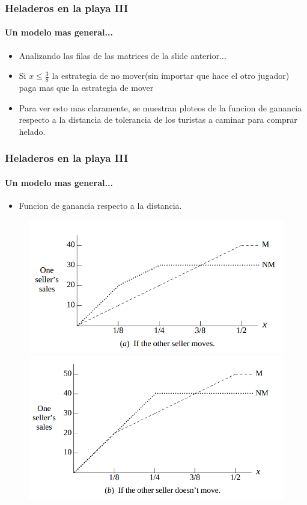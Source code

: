 \documentclass{beamer}
\begin{document}
\begin{frame}
  \frametitle{Heladeros en la playa III}
  \framesubtitle{Un modelo mas general...}
  \begin{itemize}
    \setlength{\itemsep}{4pt}
    \item Analizando las filas de las matrices de la slide anterior...
    \pause
    \item Si $ x \leq \frac{3}{8}$ la estrategia de no mover(sin importar que hace el otro jugador) paga mas que la estrategia de mover
    \pause    
    \item Para ver esto mas claramente, se muestran ploteos de la funcion de ganancia respecto a la distancia de tolerancia de los turistas a caminar para comprar helado.
  \end{itemize}
\end{frame}

\begin{frame}
  \frametitle{Heladeros en la playa III}
  \framesubtitle{Un modelo mas general...}

\begin{itemize}
    \setlength{\itemsep}{4pt}
    \item Funcion de ganancia respecto a la distancia.
    \pause
  \end{itemize}

  \begin{figure}[h!]
      \centering        
      \includegraphics[scale=0.20]{fig/plot-pago-playa1.png}
      \includegraphics[scale=0.20]{fig/plot-pago-playa2.png}
  \end{figure}
\end{frame}
\end{document}
